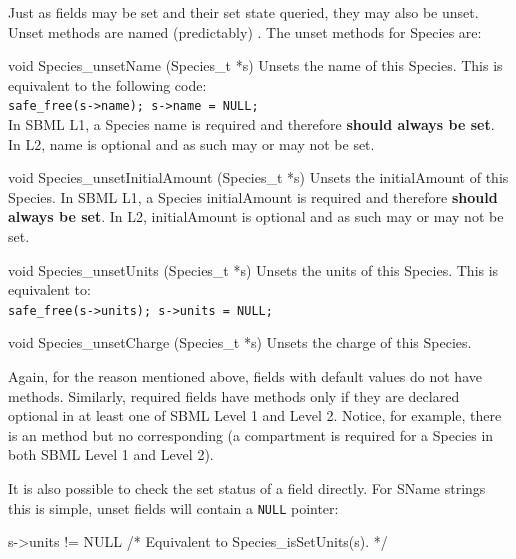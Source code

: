 \documentclass{cekmanual}
\begin{document}
Just as fields may be set and their set state queried, they may also
be unset.  Unset methods are named (predictably)
.  The unset methods for Species are:

\begin{methoddef}{void Species\_unsetName (Species\_t *s)}
  Unsets the name of this Species.  This is equivalent to the following code:\\
  \texttt{safe\_free(s->name); s->name = NULL;}
  \\
  In SBML L1, a Species name is required and therefore \textbf{should
  always be set}.  In L2, name is optional and as such may or may not
  be set.
\end{methoddef}

\begin{methoddef}{void Species\_unsetInitialAmount (Species\_t *s)}
  Unsets the initialAmount of this Species.  In SBML L1, a Species
  initialAmount is required and therefore \textbf{should always be
  set}.  In L2, initialAmount is optional and as such may or may not
  be set.
\end{methoddef}

\begin{methoddef}{void Species\_unsetUnits (Species\_t *s)}
  Unsets the units of this Species.  This is equivalent to:\\
  \texttt{safe\_free(s->units); s->units = NULL;}
\end{methoddef}

\begin{methoddef}{void Species\_unsetCharge (Species\_t *s)}
  Unsets the charge of this Species.
\end{methoddef}

Again, for the reason mentioned above, fields with default values do
not have  methods.  Similarly, required fields have
 methods only if they are declared optional in at
least one of SBML Level 1 and Level 2.  Notice, for example, there is
an  method but no corresponding
 (a compartment is required for a Species
in both SBML Level 1 and Level 2).

It is also possible to check the set status of a field directly.  For
SName strings this is simple, unset fields will contain a
\texttt{NULL} pointer:

\begin{example}[c]
  s->units != NULL  /* Equivalent to Species_isSetUnits(s). */
\end{example}
\end{document}
